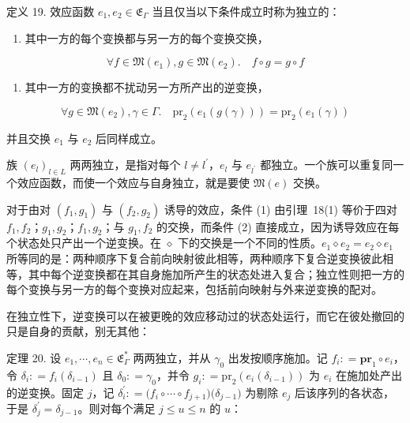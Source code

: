 \documentclass[
  10
]{article}
\providecommand{\tightlist}{%
  \setlength{\itemsep}{0pt}\setlength{\parskip}{0pt}}
\begin{document}
定义 19. 效应函数 \(e _ { 1 } , e _ { 2 } \in \mathfrak { E } _ { \Gamma }\) 当且仅当以下条件成立时称为独立的：

\begin{enumerate}
\def\labelenumi{\arabic{enumi}.}
\tightlist
\item
  其中一方的每个变换都与另一方的每个变换交换，
\end{enumerate}

\[
\forall f \in \mathfrak { M } ( e _ { 1 } ) , g \in \mathfrak { M } ( e _ { 2 } ) . \quad f \circ g = g \circ f\tag{18}
\]

\begin{enumerate}
\def\labelenumi{\arabic{enumi}.}
\setcounter{enumi}{1}
\tightlist
\item
  其中一方的变换都不扰动另一方所产出的逆变换，
\end{enumerate}

\[
\forall g \in \mathfrak { M } ( e _ { 2 } ) , \gamma \in \Gamma . \quad \mathrm { p r } _ { 2 } ( e _ { 1 } ( g ( \gamma ) ) ) = \mathrm { p r } _ { 2 } ( e _ { 1 } ( \gamma ) )\tag{19}
\]

并且交换 \(e _ { 1 }\) 与 \(e _ { 2 }\) 后同样成立。

族 \(\left( e _ { l } \right) _ { l \in L }\) 两两独立，是指对每个 \(l \neq l ^ { \prime }\)，\(e _ { l }\) 与
\(e _ { l ^ { \prime } }\) 都独立。一个族可以重复同一个效应函数，而使一个效应与自身独立，就是要使
\(\mathfrak { M } ( e )\) 交换。

对于由对 \(( f _ { 1 } , g _ { 1 } )\) 与 \(( f _ { 2 } , g _ { 2 } )\) 诱导的效应，条件 (1) 由引理~18(1) 等价于四对
\(f _ { 1 } , f _ { 2 }\)；\(g _ { 1 } , g _ { 2 }\)；\(f _ { 1 } , g _ { 2 }\)；与 \(g _ { 1 } , f _ { 2 }\) 的交换，而条件 (2) 直接成立，因为诱导效应在每个状态处只产出一个逆变换。在 $\diamond$ 下的交换是一个不同的性质。\(e _ { 1 } \diamond e _ { 2 } = e _ { 2 } \diamond e _ { 1 }\) 所等同的是：两种顺序下复合前向映射彼此相等，两种顺序下复合逆变换彼此相等，其中每个逆变换都在其自身施加所产生的状态处进入复合；独立性则把一方的每个变换与另一方的每个变换对应起来，包括前向映射与外来逆变换的配对。

在独立性下，逆变换可以在被更晚的效应移动过的状态处运行，而它在彼处撤回的只是自身的贡献，别无其他：

定理 20. 设 \(e _ { 1 } , \cdots , e _ { n } \in \mathfrak { E } _ { \Gamma } ^ { * }\) 两两独立，并从
\(\gamma _ { 0 }\) 出发按顺序施加。记 \(f _ { i } : = \mathbf { p r } _ { 1 } \circ e _ { i }\)，令
\(\delta _ { i } : = f _ { i } ( \delta _ { i - 1 } )\) 且 \(\delta _ { 0 } : = \gamma _ { 0 }\)，并令
\(g _ { i } : = \mathrm { p r } _ { 2 } ( e _ { i } ( \delta _ { i - 1 } ) )\) 为 \(e _ { i }\) 在施加处产出的逆变换。固定
\(j\)，记 \(\delta _ { i } ^ { \prime } : = \big ( f _ { i } \circ \cdots \circ f _ { j + 1 } \big ) \big ( \delta _ { j - 1 } \big )\) 为剔除 \(e _ { j }\) 后该序列的各状态，于是
\(\delta _ { j } ^ { \prime } = \delta _ { j - 1 }\)。则对每个满足 \(j \leq u \leq n\) 的 \(u\)：
\end{document}
